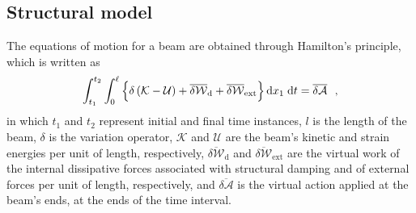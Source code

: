 \documentclass[journal]{new-aiaa}
\def\lp{\left(}
\def\rp{\right)}
\def\xo{x_1}
\def\intt{\int_{t_1}^{t_2}}
\def\intl{\int_{0}^{\ell}}
\def\d{\textnormal{d}}
\def\deltaWe{\overline{\delta\mathcal{W}}_{\text{ext}}}
\def\deltaWd{\overline{\delta\mathcal{W}}_{\text{d}}}
\def\deltaA{\overline{\delta\mathcal{A}}}
\begin{document}
\subsection{Structural model}

The equations of motion for a beam are obtained through Hamilton's principle, which is written as
\begin{equation}
    \intt\intl \left\{\delta\lp\mathcal{K}-\mathcal{U}\rp+\deltaWd+\deltaWe\right\} \d \xo\;\d t = \deltaA \ \ ,
    \label{eq:hamilton}
\end{equation}
in which $t_1$ and $t_2$ represent initial and final time instances, $l$ is the length of the beam, $\delta$ is the variation operator, $\mathcal{K}$ and $\mathcal{U}$ are the beam's kinetic and strain energies per unit of length, respectively, $\deltaWd$ and $\deltaWe$ are the virtual work of the internal dissipative forces associated with structural damping and of external forces per unit of length, respectively, and $\deltaA$ is the virtual action applied at the beam's ends, at the ends of the time interval. 
\end{document}

